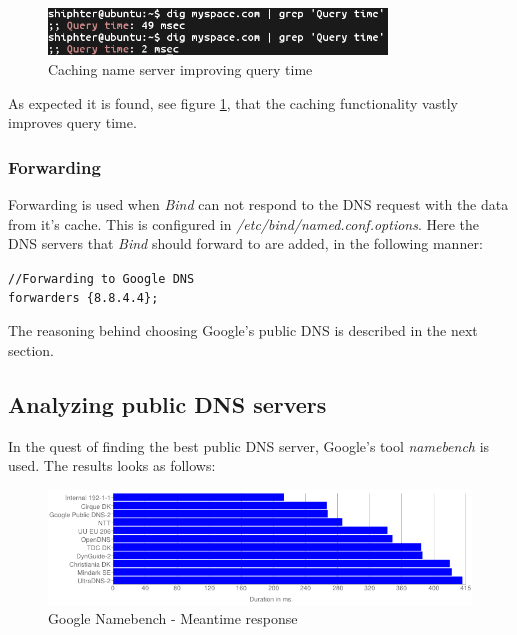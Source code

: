 \begin{figure}[ht!]
\centering
\includegraphics[width=90mm]{img/dig_caching_querytime.png}
\caption{Caching name server improving query time}
\label{dig_caching_querytime}
\end{figure}

As expected it is found, see figure \ref{dig_caching_querytime}, that the caching functionality vastly improves query time.

\subsubsection{Forwarding} 
Forwarding is used when \emph{Bind} can not respond to the DNS request with the data from it's cache. This is configured in \emph{/etc/bind/named.conf.options}. Here the DNS servers that \emph{Bind} should forward to are added, in the following manner:

\texttt{//Forwarding to Google DNS} \\
\texttt{forwarders \{8.8.4.4\};}

The reasoning behind choosing Google's public DNS is described in the next section.

\subsection{Analyzing public DNS servers}
In the quest of finding the best public DNS server, Google's tool \emph{namebench} is used. The results looks as follows:


\begin{figure}[ht!]
\centering
\includegraphics[width=150mm]{img/namebench_meantime_response_chart.png}
\caption{Google Namebench - Meantime response}
\label{namebench_meantime_response_chart}
\end{figure}

